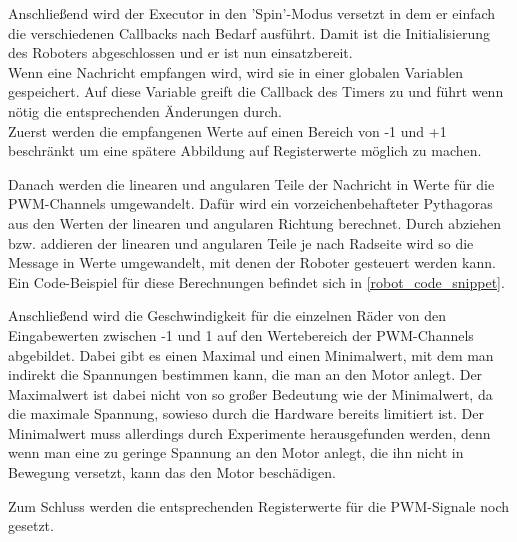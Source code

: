 \begin{flushleft}
    Anschließend wird der Executor in den 'Spin'-Modus versetzt in dem er einfach die verschiedenen Callbacks nach Bedarf ausführt.
    Damit ist die Initialisierung des Roboters abgeschlossen und er ist nun einsatzbereit.\\

    Wenn eine Nachricht empfangen wird, wird sie in einer globalen Variablen gespeichert.
    Auf diese Variable greift die Callback des Timers zu und führt wenn nötig die entsprechenden Änderungen durch.\\

    Zuerst werden die empfangenen Werte auf einen Bereich von -1 und +1 beschränkt um eine spätere Abbildung auf Registerwerte möglich zu machen.

    Danach werden die linearen und angularen Teile der Nachricht in Werte für die PWM-Channels umgewandelt.
    Dafür wird ein vorzeichenbehafteter Pythagoras aus den Werten der linearen und angularen Richtung berechnet.
    Durch abziehen bzw. addieren der linearen und angularen Teile je nach Radseite wird so die Message in Werte umgewandelt, mit denen der Roboter gesteuert werden kann.
    Ein Code-Beispiel für diese Berechnungen befindet sich in \ref{robot_code_snippet}.\newline

    Anschließend wird die Geschwindigkeit für die einzelnen Räder von den Eingabewerten zwischen -1 und 1 auf den Wertebereich der PWM-Channels abgebildet.
    Dabei gibt es einen Maximal und einen Minimalwert, mit dem man indirekt die Spannungen bestimmen kann, die man an den Motor anlegt.
    Der Maximalwert ist dabei nicht von so großer Bedeutung wie der Minimalwert, da die maximale Spannung, sowieso durch die Hardware bereits limitiert ist.
    Der Minimalwert muss allerdings durch Experimente herausgefunden werden, denn wenn man eine zu geringe Spannung an den Motor anlegt, die ihn nicht in Bewegung versetzt, kann das den Motor beschädigen.

    Zum Schluss werden die entsprechenden Registerwerte für die PWM-Signale noch gesetzt.

\end{flushleft}